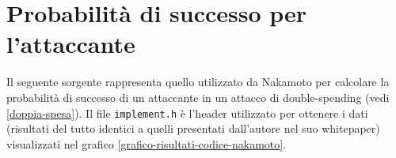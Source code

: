 \chapter{Probabilità di successo per l'attaccante}\label{src-prob-nakamoto}

Il seguente sorgente rappresenta quello utilizzato da Nakamoto per calcolare la probabilità di successo di un attaccante in un attacco di double-spending (vedi \ref{doppia-spesa}). Il file \verb|implement.h| è l'header utilizzato per ottenere i dati (risultati del tutto identici a quelli presentati dall'autore nel suo whitepaper) visualizzati nel grafico \ref{grafico-risultati-codice-nakamoto}.


